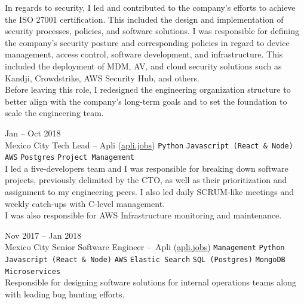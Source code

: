 \documentclass[9pt]{developercv} %
\begin{document}
\begin{entrylist}
{            In regards to security, I led and contributed to the company's efforts to achieve the
            ISO 27001 certification. This included the design and implementation of security
            processes, policies, and software solutions. I was responsible for defining the 
            company's security posture and corresponding policies in regard to device management, 
            access control, software development, and infrastructure. This included the deployment
            of MDM, AV, and cloud security solutions such as Kandji, Crowdstrike, AWS Security Hub, 
            and others.\\

            Before leaving this role, I redesigned the engineering organization structure to better 
            align with the company's long-term goals and to set the foundation to scale the 
            engineering team.
        }

    \entry
        {
            Jan -- Oct 2018
            \\\footnotesize{Mexico City}
        }
        {Tech Lead – Apli ({\href{https://apli.jobs/}{\underline{apli.jobs}}})}
        {
            \texttt{Python}
            \slashsep\texttt{Javascript (React \& Node)}
            \slashsep\texttt{AWS}
            \slashsep\texttt{Postgres}
            \slashsep\texttt{Project Management}
        }
        {\\

            I led a five-developers team and I was responsible for breaking down software projects, 
            previously delimited by the CTO, as well as their prioritization and assignment to my 
            engineering peers. I also led daily SCRUM-like meetings and weekly catch-ups with C-level
            management.\\
            
            I was also responsible for AWS Infrastructure monitoring and maintenance.
        }

    \entry
        {
            Nov 2017 -- Jan 2018
            \\\footnotesize{Mexico City}
        }
        {Senior Software Engineer – Apli ({\href{https://apli.jobs/}{\underline{apli.jobs}}})}
        {
            \texttt{Management}
            \slashsep\texttt{Python}
            \slashsep\texttt{Javascript (React \& Node)}
            \slashsep\texttt{AWS}
            \slashsep\texttt{Elastic Search}
            \slashsep\texttt{SQL (Postgres)}
            \slashsep\texttt{MongoDB}
            \slashsep\texttt{Microservices}
        }
        {\\
            Responsible for designing software solutions for internal operations teams along with 
            leading bug hunting efforts.
        }


\end{entrylist}
\end{document}
